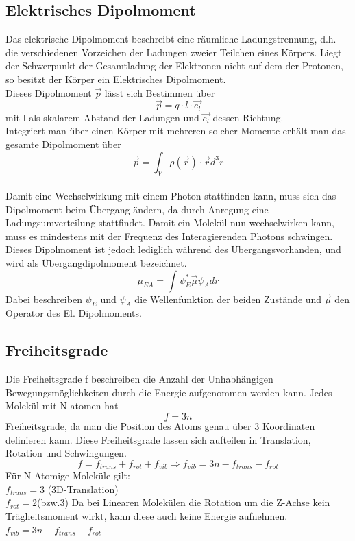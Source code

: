 \documentclass{article}
\begin{document}
    \subsection{Elektrisches Dipolmoment}
        Das elektrische Dipolmoment beschreibt eine räumliche Ladungstrennung, d.h. die verschiedenen Vorzeichen
        der Ladungen zweier Teilchen eines Körpers. Liegt der Schwerpunkt der Gesamtladung der Elektronen nicht auf dem der Protonen,
        so besitzt der Körper ein Elektrisches Dipolmoment.\\
        Dieses Dipolmoment $\vec{p}$ lässt sich Bestimmen über
        \begin{equation}
            \vec{p} = q \cdot l \cdot \vec{e_l}
        \end{equation}
        mit l als skalarem Abstand der Ladungen und $\vec{e_l}$ dessen Richtung.\\
        Integriert man über einen Körper mit mehreren solcher Momente erhält man das gesamte Dipolmoment über
        \begin{equation}
            \vec{p} = \int_V \rho(\vec{r})\cdot\vec{r}d^3r
        \end{equation}
         \\
        Damit eine Wechselwirkung mit einem Photon stattfinden kann, muss sich das Dipolmoment beim Übergang ändern,
        da durch Anregung eine Ladungsumverteilung stattfindet. Damit ein Molekül nun wechselwirken kann, muss es mindestens
        mit der Frequenz des Interagierenden Photons schwingen. Dieses Dipolmoment ist jedoch lediglich während des Übergangsvorhanden,
        und wird als Übergangdipolmoment bezeichnet.
        \begin{equation}
            \mu_{EA} = \int \psi_E^* \vec{\mu} \psi_A dr
        \end{equation}
        Dabei beschreiben $\psi_E$ und $\psi_A$ die Wellenfunktion der beiden Zustände und $\vec{\mu}$ den Operator
        des El. Dipolmoments.

    \subsection{Freiheitsgrade}
        Die Freiheitsgrade f beschreiben die Anzahl der Unhabhängigen Bewegungsmöglichkeiten durch die Energie
        aufgenommen werden kann. Jedes Molekül mit N atomen hat 
        $$ f = 3n $$
        Freiheitsgrade, da man die Position des Atoms genau über 3 Koordinaten definieren kann.
        Diese Freiheitsgrade lassen sich aufteilen in Translation, Rotation und Schwingungen.
        \begin{equation}
            f = f_{trans} + f_{rot} + f_{vib}
            \Rightarrow f_{vib} = 3n - f_{trans} - f_{rot}
        \end{equation}
        Für N-Atomige Moleküle gilt:\\
        $f_{trans} = 3$ (3D-Translation)\\
        $f_{rot} = 2$(bzw.$3$) Da bei Linearen Molekülen die Rotation um die Z-Achse kein Trägheitsmoment wirkt, kann diese auch keine Energie aufnehmen.\\
        $f_{vib} = 3n-f_{trans} - f_{rot}$\\
    
\end{document}
